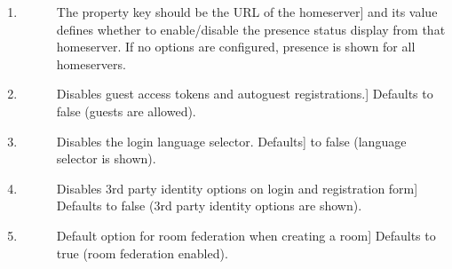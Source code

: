 \documentclass[letterpaper,10pt,openany,oneside,english]{sphinxmanual}
\begin{document}
\begin{enumerate}
\begin{enumerate}
\end{enumerate}

\item {} \begin{description}
\item[{}] \leavevmode{[}The property key should be the URL of the homeserver{]}
\sphinxAtStartPar
and its value defines whether to enable/disable the presence status display
from that homeserver. If no options are configured, presence is shown for all
homeservers.

\end{description}

\item {} \begin{description}
\item[{}] \leavevmode{[}Disables guest access tokens and auto\sphinxhyphen{}guest registrations.{]}
\sphinxAtStartPar
Defaults to false (guests are allowed).

\end{description}

\item {} \begin{description}
\item[{}] \leavevmode{[}Disables the login language selector. Defaults{]}
\sphinxAtStartPar
to false (language selector is shown).

\end{description}

\item {} \begin{description}
\item[{}] \leavevmode{[}Disables 3rd party identity options on login and registration form{]}
\sphinxAtStartPar
Defaults to false (3rd party identity options are shown).

\end{description}

\item {} \begin{description}
\item[{}] \leavevmode{[}Default option for room federation when creating a room{]}
\sphinxAtStartPar
Defaults to true (room federation enabled).

\end{description}


\end{enumerate}
\end{document}
